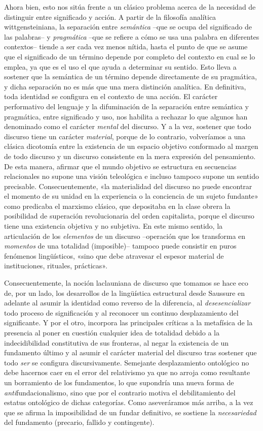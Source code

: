 Ahora bien, esto nos sitúa frente a un clásico problema acerca de la necesidad de distinguir entre significado y acción. A partir de la filosofía analítica wittgensteiniana, la separación entre \emph{semántica} --que se ocupa del significado de las palabras-- y \emph{pragmática} --que se refiere a cómo se usa una palabra en diferentes contextos-- tiende a ser cada vez menos nítida, hasta el punto de que se asume que el significado de un término depende por completo del contexto en cual se lo emplea, ya que es el uso el que ayuda a determinar su sentido. Esto lleva a sostener que la semántica de un término depende directamente de su pragmática, y dicha separación no es más que una mera distinción analítica. En definitiva, toda identidad se configura en el contexto de una acción. El carácter performativo del lenguaje y la difuminación de la separación entre semántica y pragmática, entre significado y uso, nos habilita a rechazar lo que algunos han denominado como el carácter \emph{mental} del discurso. Y a la vez, sostener que todo discurso tiene un carácter \emph{material}, porque de lo contrario, volveríamos a una clásica dicotomía entre la existencia de un espacio objetivo conformado al margen de todo discurso y un discurso consistente en la mera expresión del pensamiento. De esta manera, afirmar que el mundo objetivo se estructura en secuencias relacionales no supone una visión teleológica e incluso tampoco supone un sentido precisable. Consecuentemente, «la materialidad del discurso no puede encontrar el momento de su unidad en la experiencia o la conciencia de un sujeto fundante» como predicaba el marxismo clásico, que depositaba en la clase obrera la posibilidad de superación revolucionaria del orden capitalista, porque el discurso tiene una existencia objetiva y no subjetiva. En este mismo sentido, la articulación de los \emph{elementos} de un discurso --operación que los transforma en \emph{momentos} de una totalidad (imposible)-- tampoco puede consistir en puros fenómenos lingüísticos, «sino que debe atravesar el espesor material de instituciones, rituales, prácticas».

Consecuentemente, la noción laclauniana de discurso que tomamos se hace eco de, por un lado, los desarrollos de la lingüística estructural desde Saussure en adelante al asumir la identidad como reverso de la diferencia, al \emph{desesencializar} todo proceso de significación y al reconocer un continuo desplazamiento del significante. Y por el otro, incorpora las principales críticas a la metafísica de la presencia al poner en cuestión cualquier idea de totalidad debido a la indecidibilidad constitutiva de sus fronteras, al negar la existencia de un fundamento último y al asumir el carácter material del discurso tras sostener que todo \emph{ser} se configura discursivamente. Semejante desplazamiento ontológico no debe hacernos caer en el error del relativismo ya que no arroja como resultante un borramiento de los fundamentos, lo que supondría una nueva forma de \emph{anti}fundacionalismo, sino que por el contrario motiva el debilitamiento del estatus ontológico de dichas categorías. Como aseveráramos más arriba, a la vez que se afirma la imposibilidad de un fundar definitivo, se sostiene la \emph{necesariedad} del fundamento (precario, fallido y contingente).

